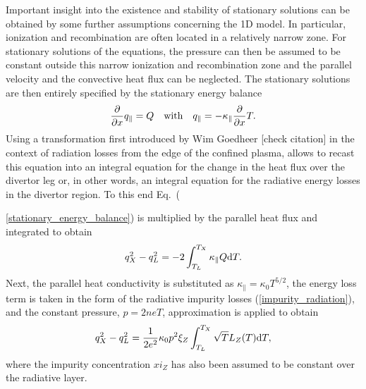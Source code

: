 \documentclass[amsmath,amssymb,a4]{revtex4-2}
\begin{document}
Important insight into the existence and stability of stationary solutions can be obtained by some further assumptions concerning the 1D model. In particular, ionization and recombination are often located in a relatively narrow zone. For stationary solutions of the equations, the pressure can then be assumed to be constant outside this narrow ionization and recombination zone and the parallel velocity and the convective heat flux can be neglected. The stationary solutions are then entirely specified by the stationary energy balance
\begin{equation}\label{stationary_energy_balance}
    {\partial \over \partial x} q_\parallel = Q \quad\hbox{with}\quad q_\parallel = - \kappa_\parallel {\partial \over \partial x} T.
\end{equation}
Using a transformation first introduced by Wim Goedheer [check citation] in the context of radiation losses from the edge of the confined plasma, allows to recast this equation into an integral equation for the change in the heat flux over the divertor leg or, in other words, an integral equation for the radiative energy losses in the divertor region. To this end Eq.~({\ref{stationary_energy_balance}) is multiplied by the parallel heat flux and integrated to obtain
\begin{equation}\label{flux_change}
    q_X^2 - q_L^2 = - 2 \int_{T_L}^{T_X} \kappa_\parallel Q {\rm d}T.
\end{equation}
Next, the parallel heat conductivity is substituted as $\kappa_\parallel = \kappa_0 T^{5/2}$, the energy loss term is taken in the form of the radiative impurity losses (\ref{impurity_radiation}), and the constant pressure, $ p = 2 neT$, approximation is applied to obtain~\cite{lengyel1981,capes1992,hutchinson1994}
\begin{equation}\label{flux_change_2}
    q_X^2 - q_L^2 = {1\over2 e^2} \kappa_0 p^2 \xi_Z \int_{T_L}^{T_X} \sqrt{T} L_Z(T) {\rm d}T,
\end{equation}
where the impurity concentration $xi_Z$ has also been assumed to be constant over the radiative layer.

}
\end{document}
